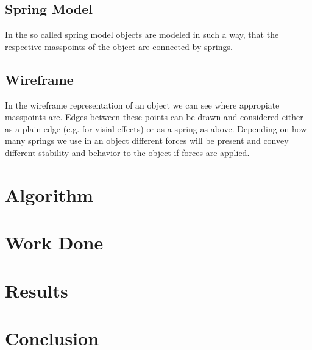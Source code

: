 \documentclass[11pt]{article}
\begin{document}
\subsection{Spring Model}
In the so called spring model objects are modeled in such a way, that the respective masspoints of the object are connected by springs.

\subsection{Wireframe}
In the wireframe representation of an object we can see where appropiate masspoints are. Edges between these points can be drawn and considered either as a plain edge (e.g. for visial effects) or as a spring as above. Depending on how many springs we use in an object different forces will be present and convey different stability and behavior to the object if forces are applied.
%
%
%
\section{Algorithm}

\section{Work Done}

\section{Results}

\section{Conclusion}
%


%
%
\newpage
\nocite{hill}
\nocite{rogersadams}
\nocite{dam}
\nocite{PBDM}
\nocite{baker}
\nocite{bakerGL}
\nocite{IASDO}
\nocite{LSCS}
\nocite{DCMSM}
\nocite{gama}
\nocite{wiki}
\nocite{hair}
\nocite{pyGL}



%
%
\end{document}
